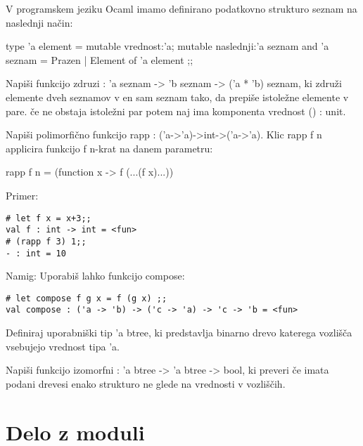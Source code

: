 \begin{ex}
  V programskem jeziku Ocaml imamo definirano podatkovno strukturo
  seznam na naslednji na\v cin:

  type 'a element = { 
     mutable vrednost:'a; 
     mutable naslednji:'a seznam 
  } 
  and 'a seznam = Prazen | Element of 'a element ;; 

  Napi\v si funkcijo zdruzi : 'a seznam -> 'b seznam -> ('a * 'b)
  seznam, ki zdru\v zi elemente dveh seznamov v en sam seznam tako, da
  prepi\v se istole\v zne elemente v pare. \v ce ne obstaja istole\v
  zni par potem naj ima komponenta vrednost () : unit.

 
\end{ex} 
\begin{ex}
  Napi\v si polimorfi\v cno funkcijo rapp :
  ('a->'a)->int->('a->'a). Klic rapp f n applicira funkcijo f n-krat
  na danem parametru:

  rapp f n = (function x -> f (...(f x)...))     

\noindent\/Primer:            
\begin{lstlisting}
# let f x = x+3;; 
val f : int -> int = <fun> 
# (rapp f 3) 1;; 
- : int = 10 

\end{lstlisting}

Namig: Uporabi\v s lahko funkcijo compose:

\begin{lstlisting}
# let compose f g x = f (g x) ;; 
val compose : ('a -> 'b) -> ('c -> 'a) -> 'c -> 'b = <fun> 
\end{lstlisting}

\end{ex} 
\begin{ex}
  Definiraj uporabni\v ski tip 'a btree, ki predstavlja binarno drevo
  katerega vozli\v s\v ca vsebujejo vrednost tipa 'a.

  Napi\v si funkcijo izomorfni : 'a btree -> 'a btree -> bool, ki
  preveri \v ce imata podani drevesi enako strukturo ne glede na
  vrednosti v vozli\v s\v cih.


\end{ex} 

\chapter{Delo z moduli}

